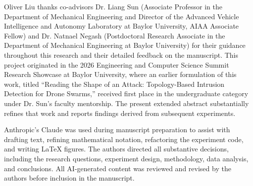 \documentclass[conf]{new-aiaa}
\begin{document}
Oliver Liu thanks co-advisors Dr. Liang Sun (Associate Professor in the Department of Mechanical Engineering and Director of the Advanced Vehicle Intelligence and Autonomy Laboratory at Baylor University, AIAA Associate Fellow) and Dr. Natnael Negash (Postdoctoral Research Associate in the Department of Mechanical Engineering at Baylor University) for their guidance throughout this research and their detailed feedback on the manuscript. This project originated in the 2026 Engineering and Computer Science Summit Research Showcase at Baylor University, where an earlier formulation of this work, titled ``Reading the Shape of an Attack: Topology-Based Intrusion Detection for Drone Swarms,'' received first place in the undergraduate category under Dr. Sun's faculty mentorship. The present extended abstract substantially refines that work and reports findings derived from subsequent experiments.

Anthropic's Claude was used during manuscript preparation to assist with drafting text, refining mathematical notation, refactoring the experiment code, and writing \LaTeX{} figures. The authors directed all substantive decisions, including the research questions, experiment design, methodology, data analysis, and conclusions. All AI-generated content was reviewed and revised by the authors before inclusion in the manuscript.


\end{document}
